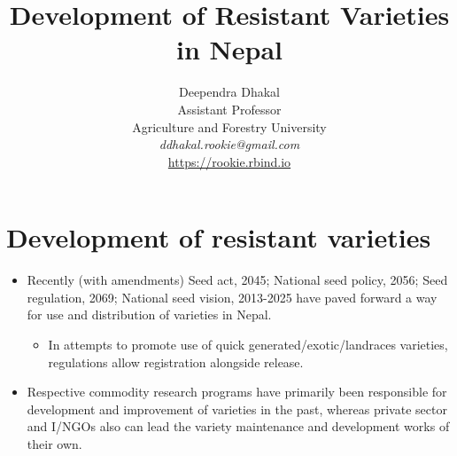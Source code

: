\documentclass[11pt,dvipsnames,ignorenonframetext,aspectratio=169]{beamer}
\title[]{Development of Resistant Varieties in Nepal}
\author[
        Deependra Dhakal\\
Assistant Professor\\
Agriculture and Forestry University\\
\textit{ddhakal.rookie@gmail.com}\\
\url{https://rookie.rbind.io}
    ]{Deependra Dhakal\\
Assistant Professor\\
Agriculture and Forestry University\\
\textit{ddhakal.rookie@gmail.com}\\
\url{https://rookie.rbind.io}}
\date[
      
  ]{
    }
\providecommand{\tightlist}{%
  \setlength{\itemsep}{0pt}\setlength{\parskip}{0pt}}
\begin{document}
  \begin{frame}[plain]
  \titlepage
  \end{frame}



\hypertarget{development-of-resistant-varieties}{%
\section{Development of resistant
varieties}\label{development-of-resistant-varieties}}

\begin{frame}{}
\protect\hypertarget{section}{}
\small

\begin{itemize}
\tightlist
\item
  Recently (with amendments) Seed act, 2045; National seed policy, 2056;
  Seed regulation, 2069; National seed vision, 2013-2025 have paved
  forward a way for use and distribution of varieties in Nepal.

  \begin{itemize}
  \tightlist
  \item
    In attempts to promote use of quick generated/exotic/landraces
    varieties, regulations allow \alert{registration} alongside
    \alert{release}.
  \end{itemize}
\item
  Respective commodity research programs have primarily been responsible
  for development and improvement of varieties in the past, whereas
  private sector and I/NGOs also can lead the variety maintenance and
  development works of their own.
\end{itemize}
\end{frame}
\end{document}
